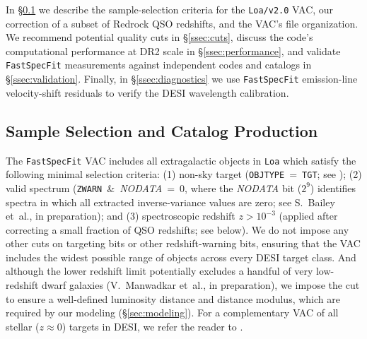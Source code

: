 \documentclass[modern,linenumbers]{aastex702}
\newcommand{\fastspecfit}{\texttt{FastSpecFit}}
\begin{document}
In \S\ref{ssec:catalog} we describe the sample-selection criteria for
the \texttt{Loa/v2.0} VAC, our correction of a subset of Redrock QSO
redshifts, and the VAC's file organization. We recommend potential
quality cuts in \S\ref{ssec:cuts}, discuss the code's computational
performance at DR2 scale in \S\ref{ssec:performance}, and validate
\fastspecfit{} measurements against independent codes and catalogs in
\S\ref{ssec:validation}. Finally, in \S\ref{ssec:diagnostics} we use
\fastspecfit{} emission-line velocity-shift residuals to verify the
DESI wavelength calibration.

\subsection{Sample Selection and Catalog Production}
\label{ssec:catalog}

The \fastspecfit{} VAC includes all extragalactic objects in
\texttt{Loa} which satisfy the following minimal selection criteria:
(1) non-sky target (\texttt{OBJTYPE}~=~\texttt{TGT}; see
\citealt{myers23a}); (2) valid spectrum
(\texttt{ZWARN}~\&~\textit{NODATA}~=~0, where the \textit{NODATA} bit
($2^9$) identifies spectra in which all extracted inverse-variance values are
zero; see S.~Bailey et~al., in preparation); and (3) spectroscopic
redshift $z > 10^{-3}$ (applied after correcting a small fraction of
QSO redshifts; see below). We do not impose any other cuts on
targeting bits or other redshift-warning bits, ensuring that the VAC
includes the widest possible range of objects across every DESI target
class. And although the lower redshift limit potentially excludes a
handful of very low-redshift dwarf galaxies (V.~Manwadkar et~al., in
preparation), we impose the cut to ensure a well-defined luminosity
distance and distance modulus, which are required by our modeling
(\S\ref{sec:modeling}). For a complementary VAC of all stellar
($z\approx0$) targets in DESI, we refer the reader to
\citet{koposov26a}.


\end{document}
